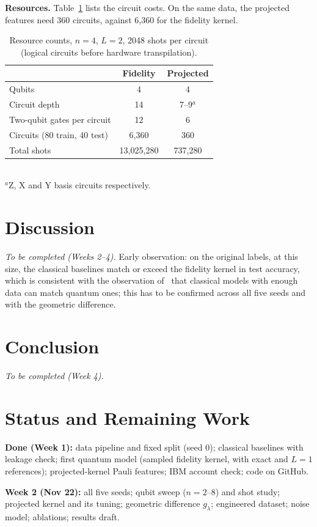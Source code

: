 \documentclass[conference]{IEEEtran}
\begin{document}
\textbf{Resources.} Table~\ref{tab:res} lists the circuit costs. On the same data, the projected features need 360 circuits, against 6{,}360 for the fidelity kernel.

\begin{table}[t]
\centering
\caption{Resource counts, $n=4$, $L=2$, 2048 shots per circuit (logical circuits before hardware transpilation).}
\label{tab:res}
\footnotesize
\begin{tabular}{@{}lcc@{}}
\toprule
 & Fidelity & Projected \\
\midrule
Qubits & 4 & 4 \\
Circuit depth & 14 & 7--9$^{a}$ \\
Two-qubit gates per circuit & 12 & 6 \\
Circuits (80 train, 40 test) & 6{,}360 & 360 \\
Total shots & 13{,}025{,}280 & 737{,}280 \\
\bottomrule
\end{tabular}
\\[2pt]{\footnotesize $^{a}$Z, X and Y basis circuits respectively.}
\end{table}

\section{Discussion}
\textit{To be completed (Weeks 2--4).} Early observation: on the original labels, at this size, the classical baselines match or exceed the fidelity kernel in test accuracy, which is consistent with the observation of~\cite{huang2021} that classical models with enough data can match quantum ones; this has to be confirmed across all five seeds and with the geometric difference.

\section{Conclusion}
\textit{To be completed (Week 4).}

\section*{Status and Remaining Work}
\textbf{Done (Week 1):} data pipeline and fixed split (seed 0); classical baselines with leakage check; first quantum model (sampled fidelity kernel, with exact and $L=1$ references); projected-kernel Pauli features; IBM account check; code on GitHub.

\textbf{Week 2 (Nov 22):} all five seeds; qubit sweep ($n=2$--$8$) and shot study; projected kernel and its tuning; geometric difference $g_\lambda$; engineered dataset; noise model; ablations; results draft.
\end{document}
